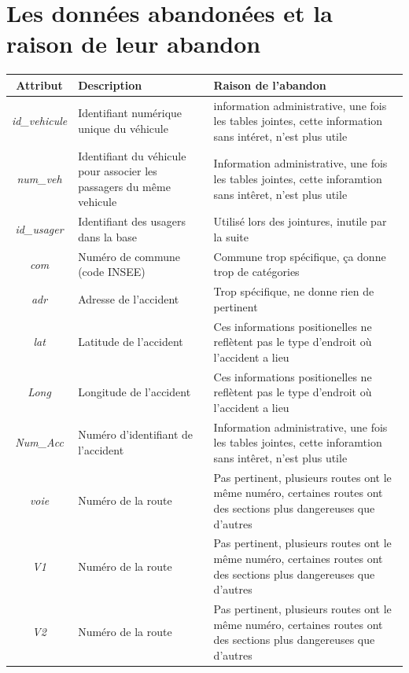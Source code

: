 \documentclass{article}
\begin{document}
    \section{Les données abandonées et la raison de leur abandon}\label{appendix:dataset}
    \begin{center}
        \scriptsize
        \begin{tabular}{ |c|p{3.5cm}|p{7cm}| }
            \hline
            \textbf{Attribut} & \textbf{Description} & \textbf{Raison de l'abandon} \\
            \hline
            \textit{id\_vehicule} & Identifiant numérique unique du véhicule & information administrative, une fois les tables jointes, cette information sans intéret, n'est plus utile\\
            \textit{num\_veh} & Identifiant du véhicule pour associer les passagers du même vehicule & Information administrative, une fois les tables jointes, cette inforamtion sans intêret, n'est plus utile\\
            \textit{id\_usager} & Identifiant des usagers dans la base & Utilisé lors des jointures, inutile par la suite\\
            \textit{com} & Numéro de commune (code INSEE) & Commune trop spécifique, ça donne trop de catégories\\
            \textit{adr} & Adresse de l'accident & Trop spécifique, ne donne rien de pertinent\\
            \textit{lat} & Latitude de l'accident & Ces informations positionelles ne reflètent pas le type d'endroit où l'accident a lieu\\
            \textit{Long} & Longitude de l'accident & Ces informations positionelles ne reflètent pas le type d'endroit où l'accident a lieu\\
            \textit{Num\_Acc} & Numéro d'identifiant de l'accident & Information administrative, une fois les tables jointes, cette inforamtion sans intêret, n'est plus utile\\
            \textit{voie} & Numéro de la route & Pas pertinent, plusieurs routes ont le même numéro, certaines routes ont des sections plus dangereuses que d'autres\\
            \textit{V1} & Numéro de la route & Pas pertinent, plusieurs routes ont le même numéro, certaines routes ont des sections plus dangereuses que d'autres\\
            \textit{V2} & Numéro de la route & Pas pertinent, plusieurs routes ont le même numéro, certaines routes ont des sections plus dangereuses que d'autres\\

\end{tabular}
\end{center}
\end{document}
